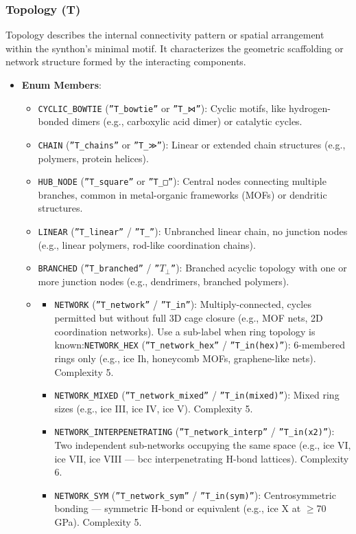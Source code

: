 \documentclass[12pt,a4paper]{article}
\begin{document}
\subsubsection{Topology (T)}

Topology describes the internal connectivity pattern or spatial arrangement within the synthon's minimal motif. It characterizes the geometric scaffolding or network structure formed by the interacting components.

\begin{itemize}
    \item 
    \textbf{Enum Members}:

    \begin{itemize}
    \item \texttt{CYCLIC\_BOWTIE} (\texttt{''T\_bowtie''} or \texttt{''T\_⋈''}): Cyclic motifs, like hydrogen-bonded dimers (e.g., carboxylic acid dimer) or catalytic cycles.
    \item \texttt{CHAIN} (\texttt{''T\_chains''} or \texttt{''T\_≫''}): Linear or extended chain structures (e.g., polymers, protein helices).
    \item \texttt{HUB\_NODE} (\texttt{''T\_square''} or \texttt{''T\_□''}): Central nodes connecting multiple branches, common in metal-organic frameworks (MOFs) or dendritic structures.
    \item \texttt{LINEAR} (\texttt{''T\_linear''} / \texttt{''T\_\textbar{}''}): Unbranched linear chain, no junction nodes (e.g., linear polymers, rod-like coordination chains).
    \item \texttt{BRANCHED} (\texttt{''T\_branched''} / \texttt{''$T_{\perp}$''}): Branched acyclic topology with one or more junction nodes (e.g., dendrimers, branched polymers).
    \item 
    \begin{itemize}
    \item \texttt{NETWORK} (\texttt{''T\_network''} / \texttt{''T\_in''}): Multiply-connected, cycles permitted but without full 3D cage closure (e.g., MOF nets, 2D coordination networks). Use a sub-label when ring topology is known:\texttt{NETWORK\_HEX} (\texttt{''T\_network\_hex''} / \texttt{''T\_in(hex)''}): 6-membered rings only (e.g., ice Ih, honeycomb MOFs, graphene-like nets). Complexity 5.
    \item \texttt{NETWORK\_MIXED} (\texttt{''T\_network\_mixed''} / \texttt{''T\_in(mixed)''}): Mixed ring sizes (e.g., ice III, ice IV, ice V). Complexity 5.
    \item \texttt{NETWORK\_INTERPENETRATING} (\texttt{''T\_network\_interp''} / \texttt{''T\_in(x2)''}): Two independent sub-networks occupying the same space (e.g., ice VI, ice VII, ice VIII --- bcc interpenetrating H-bond lattices). Complexity 6.
    \item \texttt{NETWORK\_SYM} (\texttt{''T\_network\_sym''} / \texttt{''T\_in(sym)''}): Centrosymmetric bonding --- symmetric H-bond or equivalent (e.g., ice X at $\geq$70 GPa). Complexity 5.
\end{itemize}


\end{itemize}
\end{itemize}
\end{document}
